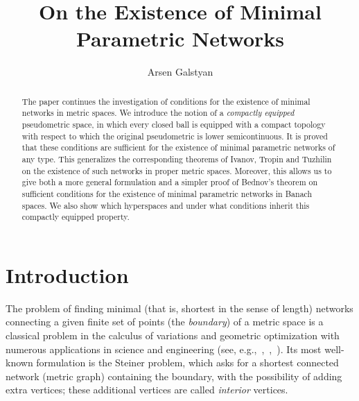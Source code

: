 \documentclass{svproc}
\begin{document}
\mainmatter     
%
\title{On the Existence of Minimal Parametric Networks}
%
%
\author{Arsen Galstyan}
%


\maketitle              %

\begin{abstract}

The paper continues the investigation of conditions for the existence of minimal networks in metric spaces. We introduce the notion of a \textit{compactly equipped} pseudometric space, in which every closed ball is equipped with a compact topology with respect to which the original pseudometric is lower semicontinuous. It is proved that these conditions are sufficient for the existence of minimal parametric networks of any type. This generalizes the corresponding theorems of Ivanov, Tropin and Tuzhilin on the existence of such networks in proper metric spaces. Moreover, this allows us to give both a more general formulation and a simpler proof of Bednov's theorem on sufficient conditions for the existence of minimal parametric networks in Banach spaces. We also show which hyperspaces and under what conditions inherit this compactly equipped property.

\end{abstract}


%
\section*{Introduction}
%

The problem of finding minimal (that is, shortest in the sense of length) networks connecting a given finite set of points (the \textit{boundary}) of a metric space is a classical problem in the calculus of variations and geometric optimization with numerous applications in science and engineering (see, e.g.,~\cite{Hwang},~\cite{Review},~\cite{Cheng}). Its most well-known formulation is the Steiner problem, which asks for a shortest connected network (metric graph) containing the boundary, with the possibility of adding extra vertices; these additional vertices are called \textit{interior} vertices.
\end{document}
